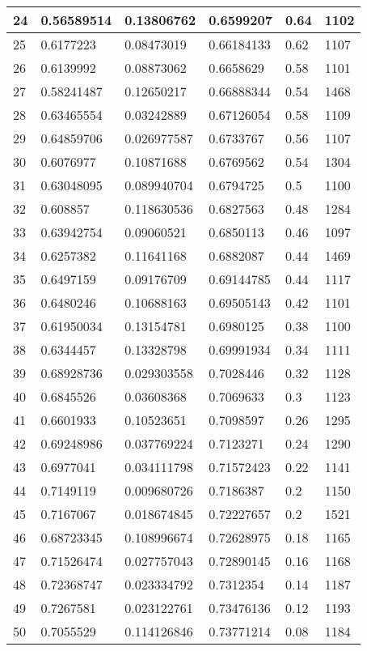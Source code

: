 \begin{longtable}{|l|l|l|l|l|l|}
24 & 0.56589514 & 0.13806762 & 0.6599207 & 0.64 & 1102 \\ \hline 
25 & 0.6177223 & 0.08473019 & 0.66184133 & 0.62 & 1107 \\ \hline 
26 & 0.6139992 & 0.08873062 & 0.6658629 & 0.58 & 1101 \\ \hline 
27 & 0.58241487 & 0.12650217 & 0.66888344 & 0.54 & 1468 \\ \hline 
28 & 0.63465554 & 0.03242889 & 0.67126054 & 0.58 & 1109 \\ \hline 
29 & 0.64859706 & 0.026977587 & 0.6733767 & 0.56 & 1107 \\ \hline 
30 & 0.6076977 & 0.10871688 & 0.6769562 & 0.54 & 1304 \\ \hline 
31 & 0.63048095 & 0.089940704 & 0.6794725 & 0.5 & 1100 \\ \hline 
32 & 0.608857 & 0.118630536 & 0.6827563 & 0.48 & 1284 \\ \hline 
33 & 0.63942754 & 0.09060521 & 0.6850113 & 0.46 & 1097 \\ \hline 
34 & 0.6257382 & 0.11641168 & 0.6882087 & 0.44 & 1469 \\ \hline 
35 & 0.6497159 & 0.09176709 & 0.69144785 & 0.44 & 1117 \\ \hline 
36 & 0.6480246 & 0.10688163 & 0.69505143 & 0.42 & 1101 \\ \hline 
37 & 0.61950034 & 0.13154781 & 0.6980125 & 0.38 & 1100 \\ \hline 
38 & 0.6344457 & 0.13328798 & 0.69991934 & 0.34 & 1111 \\ \hline 
39 & 0.68928736 & 0.029303558 & 0.7028446 & 0.32 & 1128 \\ \hline 
40 & 0.6845526 & 0.03608368 & 0.7069633 & 0.3 & 1123 \\ \hline 
41 & 0.6601933 & 0.10523651 & 0.7098597 & 0.26 & 1295 \\ \hline 
42 & 0.69248986 & 0.037769224 & 0.7123271 & 0.24 & 1290 \\ \hline 
43 & 0.6977041 & 0.034111798 & 0.71572423 & 0.22 & 1141 \\ \hline 
44 & 0.7149119 & 0.009680726 & 0.7186387 & 0.2 & 1150 \\ \hline 
45 & 0.7167067 & 0.018674845 & 0.72227657 & 0.2 & 1521 \\ \hline 
46 & 0.68723345 & 0.108996674 & 0.72628975 & 0.18 & 1165 \\ \hline 
47 & 0.71526474 & 0.027757043 & 0.72890145 & 0.16 & 1168 \\ \hline 
48 & 0.72368747 & 0.023334792 & 0.7312354 & 0.14 & 1187 \\ \hline 
49 & 0.7267581 & 0.023122761 & 0.73476136 & 0.12 & 1193 \\ \hline 
50 & 0.7055529 & 0.114126846 & 0.73771214 & 0.08 & 1184 \\ \hline 
\end{longtable}